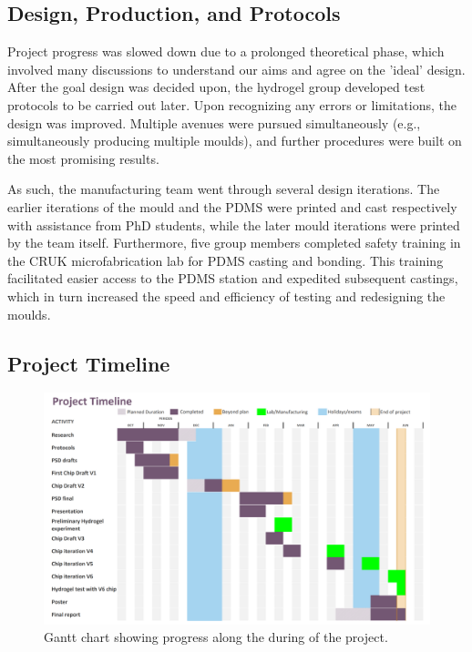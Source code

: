 \documentclass[letterpaper,12pt]{article}
\begin{document}
\subsection{Design, Production, and Protocols}
Project progress was slowed down due to a prolonged theoretical phase, which involved many discussions to understand our aims and agree on the 'ideal' design. After the goal design was decided upon, the hydrogel group developed test protocols to be carried out later. Upon recognizing any errors or limitations, the design was improved. Multiple avenues were pursued simultaneously (e.g., simultaneously producing multiple moulds), and further procedures were built on the most promising results.

As such, the manufacturing team went through several design iterations. The earlier iterations of the mould and the PDMS were printed and cast respectively with assistance from PhD students, while the later mould iterations were printed by the team itself. Furthermore, five group members completed safety training in the CRUK microfabrication lab for PDMS casting and bonding. This training facilitated easier access to the PDMS station and expedited subsequent castings, which in turn increased the speed and efficiency of testing and redesigning the moulds. 

\subsection{Project Timeline}

\begin{figure}[h!]
    \centering
    \includegraphics[width=1\linewidth]{figures/Gantt chart.png}
    \caption{Gantt chart showing progress along the during of the project.}
    \label{fig:gantt}
\end{figure}
\newpage
\end{document}
